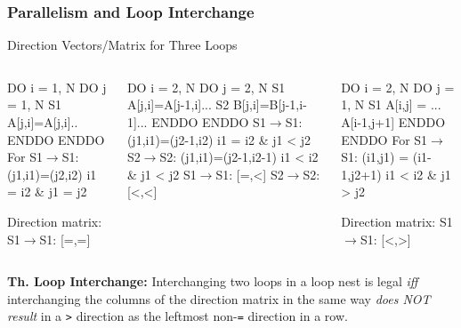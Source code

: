 \documentclass{beamer}
\newcommand{\emp}[1]{\textcolor{DikuRed}{ #1}}
\newcommand{\mymath}[1]{$ #1 $}
\begin{document}
\begin{frame}[fragile,t]
  \frametitle{Parallelism and Loop Interchange} %

\begin{block}{Direction Vectors/Matrix for Three Loops }
\begin{columns}
\begin{colorcode}
  DO i = 1, N
    DO j = 1, N
S1    A[j,i]=A[j,i]..
    ENDDO
  ENDDO
For S1\mymath{\rightarrow}S1: 
    (j1,i1)=(j2,i2) 
    i1 \emp{=} i2 \& j1 \emp{=} j2

Direction matrix:
S1\mymath{\rightarrow}S1: \emp{[=,=]}
\end{colorcode}
\begin{colorcode}
  DO i = 2, N
    DO j = 2, N
S1    A[j,i]=A[j-1,i]...
S2    B[j,i]=B[j-1,i-1]...
    ENDDO
  ENDDO
S1\mymath{\rightarrow}S1: (j1,i1)=(j2-1,i2)
        i1 \emp{=} i2 \& j1 \emp{<} j2
S2\mymath{\rightarrow}S2: (j1,i1)=(j2-1,i2-1)
        i1 \emp{<} i2 \& j1 \emp{<} j2
S1\mymath{\rightarrow}S1: \emp{[=,<]}
S2\mymath{\rightarrow}S2: \emp{[<,<]}
\end{colorcode}
\begin{colorcode}
   DO i = 2, N
    DO j = 1, N
 S1   A[i,j] = ...
        A[i-1,j+1]
   ENDDO ENDDO
  For S1\mymath{\rightarrow}S1: 
    (i1,j1) = (i1-1,j2+1)
    i1 \emp{<} i2 \& j1 \emp{>} j2

  Direction matrix:
  S1\mymath{\rightarrow}S1: \emp{[<,>]}
\end{colorcode}
\end{columns}
\end{block} 

{\bf Th. Loop Interchange:} Interchanging two loops in a loop nest 
is legal {\em iff} interchanging the columns of the direction matrix
in the same way {\em does NOT result} in a {\tt >} direction as the
leftmost non-{\tt{}=} direction in a row. 
\end{frame}
\end{document}
